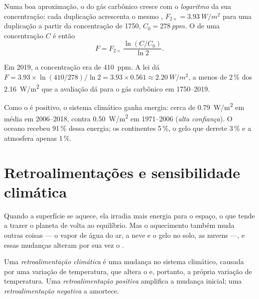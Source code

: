 \begin{proposition}\label{prop:g12:climate-change:log}
Numa boa aproximação, o  do gás carbônico cresce com o
\emph{logaritmo} da sua concentração: cada duplicação acrescenta o mesmo
, $F_{2\times} = \qty{3.93}{W/m^2}$ para uma duplicação a partir da
concentração de 1750, $C_0 = \qty{278}{ppm}$. O  de uma
concentração $C$ é então
\[
  F = F_{2\times}\,\frac{\ln (C/C_0)}{\ln 2}.
\]
\end{proposition}

\begin{example}\label{ex:g12:climate-change:check}
Em 2019, a concentração era de \qty{410}{ppm}. A lei dá
$F = 3.93 \times \ln(410/278)/\ln 2 = 3.93 \times 0.561 \approx
\qty{2.20}{W/m^2}$, a menos de 2\,\% dos \qty{2.16}{W/m^2} que a
avaliação dá para o gás carbônico em 1750--2019.
\end{example}

\begin{proposition}\label{prop:g12:climate-change:heating}
Como o  é positivo, o sistema climático ganha energia: cerca de
\qty{0.79}{W/m^2} em média em 2006--2018, contra \qty{0.50}{W/m^2} em
1971--2006 (\emph{alta confiança}). O oceano recebeu 91\,\% dessa energia;
os continentes 5\,\%, o gelo que derrete 3\,\% e a atmosfera apenas 1\,\%.
\end{proposition}

\section{Retroalimentações e sensibilidade climática}

Quando a superfície se aquece, ela irradia mais energia para o espaço, o que
tende a trazer o planeta de volta ao equilíbrio. Mas o aquecimento também
muda outras coisas --- o vapor de água do ar, a neve e o gelo no solo, as
nuvens ---, e essas mudanças alteram por sua vez o .

\begin{definition}\label{def:g12:climate-change:feedback}
Uma \emph{retroalimentação climática} é uma mudança no
sistema climático, causada por uma variação de temperatura, que altera o
 e, portanto, a própria variação de temperatura. Uma
\emph{retroalimentação positiva} amplifica a mudança inicial; uma
\emph{retroalimentação negativa} a amortece.
\end{definition}

